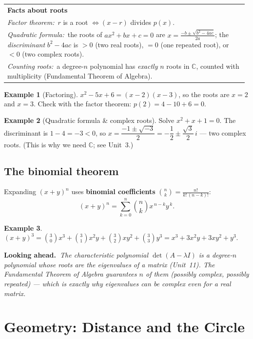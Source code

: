 \documentclass[11pt]{article}
\makeatletter
\theoremstyle{definition}
\newtheorem{example}{Example}[section]
\newcommand{\keybox}[2]{%
  \par\smallskip\noindent
  \begin{tabular}{@{}p{0.985\linewidth}@{}}
  \arrayrulecolor{RoyalBlue}\toprule
  {\sffamily\bfseries\color{RoyalBlue}#1}\\[2pt]#2\\
  \bottomrule
  \end{tabular}\par\smallskip}
\newcommand{\lookahead}[1]{%
  \par\smallskip\noindent
  {\sffamily\bfseries\color{BrickRed}Looking ahead.~}\textit{#1}\par\smallskip}
\newcommand{\C}{\mathbb{C}}
\newcommand{\ds}{\displaystyle}
\makeatother
\begin{document}
\keybox{Facts about roots}{%
\emph{Factor theorem:}\ $r$ is a root $\iff (x-r)$ divides $p(x)$.\\[2pt]
\emph{Quadratic formula:}\ the roots of $ax^2+bx+c=0$ are
$\ds x=\frac{-b\pm\sqrt{b^2-4ac}}{2a}$; the \emph{discriminant} $b^2-4ac$ is
$>0$ (two real roots), $=0$ (one repeated root), or $<0$ (two complex roots).\\[2pt]
\emph{Counting roots:}\ a degree-$n$ polynomial has \emph{exactly} $n$ roots in
$\C$, counted with multiplicity (Fundamental Theorem of Algebra).}

\begin{example}[Factoring]
$x^2-5x+6=(x-2)(x-3)$, so the roots are $x=2$ and $x=3$. Check with the factor
theorem: $p(2)=4-10+6=0$. \checkmark
\end{example}

\begin{example}[Quadratic formula \& complex roots]
Solve $x^2+x+1=0$. The discriminant is $1-4=-3<0$, so
$x=\dfrac{-1\pm\sqrt{-3}}{2}=-\dfrac12\pm\dfrac{\sqrt3}{2}\,i$ --- two complex
roots. (This is why we need $\C$; see Unit~3.)
\end{example}

\subsection{The binomial theorem}
Expanding $(x+y)^n$ uses \textbf{binomial coefficients}
$\displaystyle\binom{n}{k}=\frac{n!}{k!\,(n-k)!}$:
\[
(x+y)^n=\sum_{k=0}^{n}\binom{n}{k}x^{\,n-k}y^{\,k}.
\]

\begin{example}
$(x+y)^3=\binom30 x^3+\binom31 x^2 y+\binom32 x y^2+\binom33 y^3
= x^3+3x^2y+3xy^2+y^3.$
\end{example}

\lookahead{The \emph{characteristic polynomial} $\det(A-\lambda I)$ is a
degree-$n$ polynomial whose roots are the eigenvalues of a matrix (Unit~11). The
Fundamental Theorem of Algebra guarantees $n$ of them (possibly complex, possibly
repeated) --- which is exactly why eigenvalues can be complex even for a real
matrix.}

\section{Geometry: Distance and the Circle}
\end{document}
